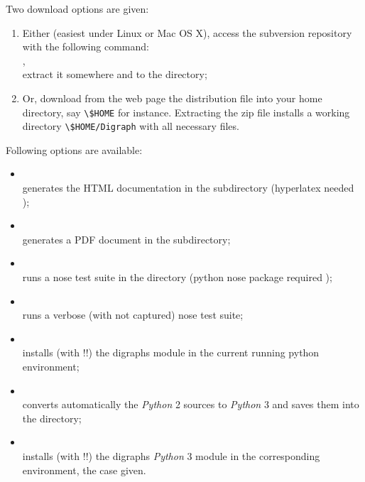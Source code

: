 \documentclass{article}
\newcommand{\+}{\verb+}
\renewcommand{\*}{\back{}}
\newcommand{\Py}{\emph{Python}\xspace }
\begin{document}
\begin{center}
Two download options are given: 
\begin{enumerate}
\item Either (easiest under Linux or Mac OS
  X), access the subversion repository with the following command:\\
  ,\\
  extract it somewhere and  to the  directory;
\item Or, download from the  web
  page the distribution file  into your home directory, say \+\$HOME+ for
  instance. Extracting the zip file installs a working directory
  \+\$HOME/Digraph+ with all necessary files.
\end{enumerate}
Following  options are available:
\begin{itemize}
\item {}\\ generates the HTML documentation in
  the  subdirectory (hyperlatex needed );
\item {}\\ generates a PDF document in the   subdirectory;
\item {}\\ runs a nose test suite in the
   directory (python nose package required  );
\item {}\\ runs a verbose (with  not
  captured) nose test suite;
\item {}\\ installs (with  !!) the digraphs module in the current running python environment;
\item {}\\ converts automatically the \Py 2 sources to
  \Py 3 and saves them into the  directory;
\item {}\\ installs (with
   !!) the digraphs \Py 3 module in the corresponding environment, the case given.  
\end{itemize}


\end{center}
\end{document}

